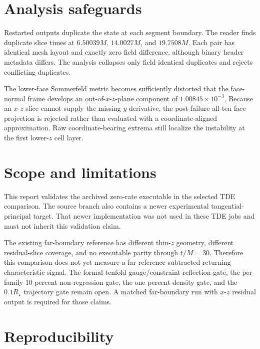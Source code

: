 \documentclass[11pt]{article}
\begin{document}
\section{Analysis safeguards}

Restarted outputs duplicate the state at each segment boundary.  The reader
finds duplicate slice times at $6.50039M$, $14.0027M$, and $19.7508M$.
Each pair has identical mesh layout and exactly zero field difference,
although binary header metadata differs.  The analysis collapses only
field-identical duplicates and rejects conflicting duplicates.

The lower-face Sommerfeld metric becomes sufficiently distorted that the
face-normal frame develops an out-of-$x$-$z$-plane component of
$1.00845\times10^{-3}$.  Because an $x$-$z$ slice cannot supply the missing
$y$ derivative, the post-failure all-ten face projection is rejected rather
than evaluated with a coordinate-aligned approximation.  Raw
coordinate-bearing extrema still localize the instability at the first
lower-$z$ cell layer.

\section{Scope and limitations}

This report validates the archived zero-rate executable in the selected TDE
comparison.  The source branch also contains a newer experimental
tangential-principal target.  That newer implementation was not used in
these TDE jobs and must not inherit this validation claim.

The existing far-boundary reference has different thin-$z$ geometry,
different residual-slice coverage, and no executable parity through
$t/M=30$.  Therefore this comparison does not yet measure a
far-reference-subtracted returning characteristic signal.  The formal
tenfold gauge/constraint reflection gate, the per-family 10 percent
non-regression gate, the one percent density gate, and the
$0.1R_{\star}$ trajectory gate remain open.  A matched far-boundary run
with $x$-$z$ residual output is required for those claims.

\section{Reproducibility}
\end{document}

